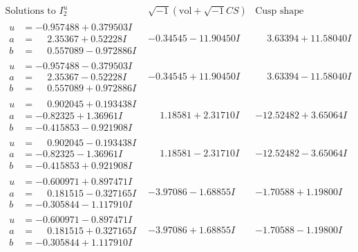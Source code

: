 \documentclass[1p]{elsarticle_modified}
\theoremstyle{definition}
\newcommand{\I}{\sqrt{-1}}
\begin{document}
$$\begin{array}{c|c|c}  
\text{Solutions to }I^u_{2}& \I (\text{vol} + \sqrt{-1}CS) & \text{Cusp shape}\\
 \hline 
\begin{aligned}
u &= -0.957488 + 0.379503 I \\
a &= \phantom{-}2.35367 + 0.52228 I \\
b &= \phantom{-}0.557089 - 0.972886 I\end{aligned}
 & -0.34545 - 11.90450 I & \phantom{-}3.63394 + 11.58040 I \\ \hline\begin{aligned}
u &= -0.957488 - 0.379503 I \\
a &= \phantom{-}2.35367 - 0.52228 I \\
b &= \phantom{-}0.557089 + 0.972886 I\end{aligned}
 & -0.34545 + 11.90450 I & \phantom{-}3.63394 - 11.58040 I \\ \hline\begin{aligned}
u &= \phantom{-}0.902045 + 0.193438 I \\
a &= -0.82325 + 1.36961 I \\
b &= -0.415853 - 0.921908 I\end{aligned}
 & \phantom{-}1.18581 + 2.31710 I & -12.52482 + 3.65064 I \\ \hline\begin{aligned}
u &= \phantom{-}0.902045 - 0.193438 I \\
a &= -0.82325 - 1.36961 I \\
b &= -0.415853 + 0.921908 I\end{aligned}
 & \phantom{-}1.18581 - 2.31710 I & -12.52482 - 3.65064 I \\ \hline\begin{aligned}
u &= -0.600971 + 0.897471 I \\
a &= \phantom{-}0.181515 - 0.327165 I \\
b &= -0.305844 - 1.117910 I\end{aligned}
 & -3.97086 - 1.68855 I & -1.70588 + 1.19800 I \\ \hline\begin{aligned}
u &= -0.600971 - 0.897471 I \\
a &= \phantom{-}0.181515 + 0.327165 I \\
b &= -0.305844 + 1.117910 I\end{aligned}
 & -3.97086 + 1.68855 I & -1.70588 - 1.19800 I \\ \hline\begin{aligned}

\end{aligned}
\end{array}$$
\end{document}
